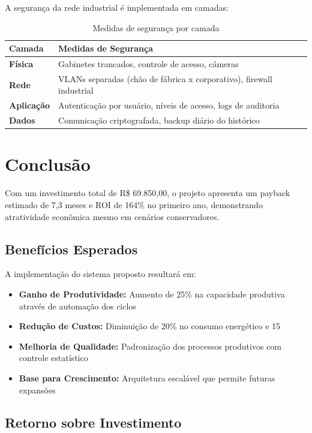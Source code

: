 \documentclass[12pt,a4paper]{article}
\begin{document}
A segurança da rede industrial é implementada em camadas:

\begin{table}[h]
\centering
\begin{tabular}{@{}p{4cm}|p{9cm}@{}}
\toprule
\textbf{Camada} & \textbf{Medidas de Segurança} \\
\midrule
\textbf{Física} & Gabinetes trancados, controle de acesso, câmeras \\
\midrule
\textbf{Rede} & VLANs separadas (chão de fábrica x corporativo), firewall industrial \\
\midrule
\textbf{Aplicação} & Autenticação por usuário, níveis de acesso, logs de auditoria \\
\midrule
\textbf{Dados} & Comunicação criptografada, backup diário do histórico \\
\bottomrule
\end{tabular}
\caption{Medidas de segurança por camada}
\end{table}

\section{Conclusão}

 Com um investimento total de R\$ 69.850,00, o projeto apresenta um payback estimado de 7,3 meses e ROI de 164\% no primeiro ano, demonstrando atratividade econômica mesmo em cenários conservadores.

\subsection{Benefícios Esperados}

A implementação do sistema proposto resultará em:

\begin{itemize}
    \item \textbf{Ganho de Produtividade:} Aumento de 25\% na capacidade produtiva através de automação dos ciclos
    \item \textbf{Redução de Custos:} Diminuição de 20\% no consumo energético e 15%
    \item \textbf{Melhoria de Qualidade:} Padronização dos processos produtivos com controle estatístico
    \item \textbf{Base para Crescimento:} Arquitetura escalável que permite futuras expansões
\end{itemize}

\subsection{Retorno sobre Investimento}
\end{document}
